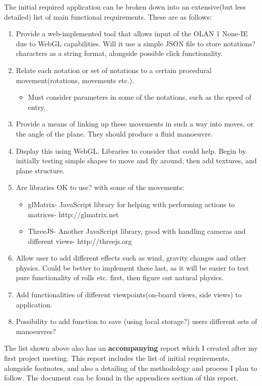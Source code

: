 \noindent The initial required application can be broken down into an extensive(but less detailed) list of main functional requirements. These are as follows:
\begin{enumerate}
	\item Provide a web-implemented tool that allows input of the OLAN 1 None-IE due to WebGL capabilities. Will it use a simple JSON file to store notations? characters as a string format, alongside possible click functionality.
	\item Relate each notation or set of notations to a certain procedural movement(rotations, movements etc.). 
		\begin{itemize}
			\item Must consider parameters in some of the notations, such as the speed of entry.
		\end{itemize}
	\item Provide a means of linking up these movements in such a way into moves, or the angle of the plane. They should produce a fluid manoeuvre.
	\item Display this using WebGL. Libraries to consider that could help. Begin by initially testing simple shapes to move and fly around, then add textures, and plane structure.
	\item Are libraries OK to use? with some of the movements:
		\begin{itemize}
			\item glMatrix- JavaScript library for helping with performing actions to matrices- http://glmatrix.net
			\item ThreeJS- Another JavaScript library, good with handling cameras and different views- http://threejs.org
		\end{itemize}
	\item Allow user to add different effects such as wind, gravity changes and other physics. Could be better to implement these last, as it will be easier to test pure functionality of rolls etc. first, then figure out natural physics.
	\item Add functionalities of different viewpoints(on-board views, side views) to application.
	\item Possibility to add function to save (using local storage?) users different sets of manoeuvres?
\end{enumerate}

The list shown above also has an \textbf{accompanying} report which I created after my first project meeting. This report includes the list of initial requirements, alongside footnotes, and also a detailing of the methodology and process I plan to follow. The document can be found in the appendices section of this report. 

